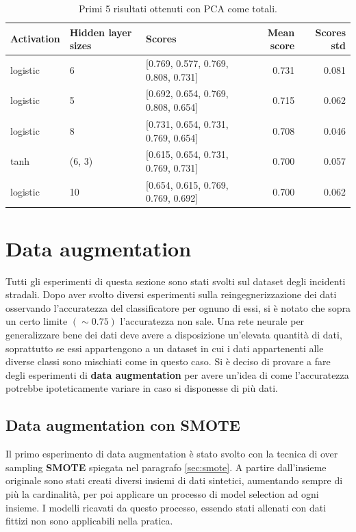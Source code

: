 \documentclass[12pt, twoside, letterpaper]{report}
\begin{document}
				\begin{table}
					\begin{tabular}{lllrr}
					\toprule
					Activation & Hidden layer sizes &                               Scores &  Mean score &  Scores std \\
					\midrule
					logistic &                  6 &  [0.769, 0.577, 0.769, 0.808, 0.731] &       0.731 &       0.081 \\
					logistic &                  5 &  [0.692, 0.654, 0.769, 0.808, 0.654] &       0.715 &       0.062 \\
					logistic &                  8 &  [0.731, 0.654, 0.731, 0.769, 0.654] &       0.708 &       0.046 \\
					tanh &             (6, 3) &  [0.615, 0.654, 0.731, 0.769, 0.731] &       0.700 &       0.057 \\
					logistic &                 10 &  [0.654, 0.615, 0.769, 0.769, 0.692] &       0.700 &       0.062 \\
					\bottomrule
					\end{tabular}
					\caption{Primi 5 risultati ottenuti con PCA come totali.}
					\label{tab:totali_pca}
				\end{table}
	
	\section{Data augmentation}
		Tutti gli esperimenti di questa sezione sono stati svolti sul dataset degli incidenti stradali. Dopo aver svolto diversi esperimenti sulla reingegnerizzazione dei dati osservando l'accuratezza del classificatore per ognuno di essi, si è notato che sopra un certo limite $(\sim 0.75)$ l'accuratezza non sale. Una rete neurale per generalizzare bene dei dati deve avere a disposizione un'elevata quantità di dati, soprattutto se essi appartengono a un dataset in cui i dati appartenenti alle diverse classi sono mischiati come in questo caso.  Si è deciso di provare a fare degli esperimenti di \textbf{data augmentation} per avere un'idea di come l'accuratezza potrebbe ipoteticamente variare in caso si disponesse di più dati.
		
		\subsection{Data augmentation con SMOTE} \label{sec:data_aug_smote}
			Il primo esperimento di data augmentation è stato svolto con la tecnica di over sampling \textbf{SMOTE} spiegata nel paragrafo \ref{sec:smote}. A partire dall'insieme originale sono stati creati diversi insiemi di dati sintetici, aumentando sempre di più la cardinalità, per poi applicare un processo di model selection ad ogni insieme. I modelli ricavati da questo processo, essendo stati allenati con dati fittizi non sono applicabili nella pratica. 
			
\end{document}
